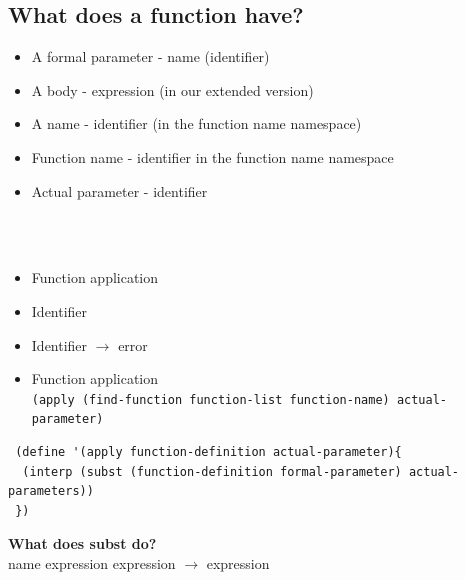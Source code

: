 \documentclass{article}
\newcommand\tab[1][1cm]{\hspace*{#1}}
\begin{document}
\begin{flushleft}
\section*{What does a function have?}
\begin{flushleft}
\begin{itemize}
 \item A formal parameter - name (identifier)
 \item A body - expression (in our extended version)
 \item A name - identifier (in the function name namespace)
 \item Function name - identifier in the function name namespace
 \item Actual parameter - identifier
\end{itemize}
\tab{Extend our expression data definition.}\\
\tab{We need to add two more variants.}\\
\begin{itemize}
 \item Function application
 \item Identifier
\end{itemize}
\tab{We need to extend the interpreter to deal with the two new variants in the data definition.}
\begin{itemize}
 \item Identifier $\rightarrow$ error
 \item Function application\\
 \verb|(apply (find-function function-list function-name) actual-parameter)|
\end{itemize}
\tab{Statement of purpose for apply, substitute the actual parameter for the formal parameter everywhere in the body of the function, then evaluate the result.}

\begin{verbatim}
 (define '(apply function-definition actual-parameter){
  (interp (subst (function-definition formal-parameter) actual-parameters))
 })
\end{verbatim}
\textbf{What does subst do?}\\
name expression expression $\rightarrow$ expression


\end{flushleft}
\end{flushleft}
\end{document}
